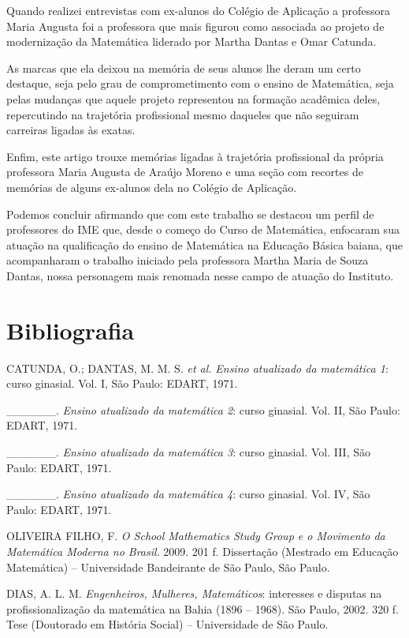 \documentclass{hipatia}
\begin{document}
\upshape

\sepdecorada

Quando realizei entrevistas com ex-alunos do Colégio de Aplicação a
professora Maria Augusta foi a professora que mais figurou como
associada ao projeto de modernização da Matemática liderado por Martha
Dantas e Omar Catunda.

As marcas que ela deixou na memória de seus alunos lhe deram um certo
destaque, seja pelo grau de comprometimento com o ensino de Matemática,
seja pelas mudanças que aquele projeto representou na formação acadêmica
deles, repercutindo na trajetória profissional mesmo daqueles que não
seguiram carreiras ligadas às exatas.

Enfim, este artigo trouxe memórias ligadas à trajetória profissional da
própria professora Maria Augusta de Araújo Moreno e uma seção com
recortes de memórias de alguns ex-alunos dela no Colégio de Aplicação.

Podemos concluir afirmando que com este trabalho se destacou um perfil
de professores do IME que, desde o começo do Curso de Matemática,
enfocaram sua atuação na qualificação do ensino de Matemática na Educação
Básica baiana, que acompanharam o trabalho iniciado pela professora
Martha Maria de Souza Dantas, nossa personagem mais renomada nesse campo
de atuação do Instituto.

\section{Bibliografia}

CATUNDA, O.; DANTAS, M. M. S. \emph{et al.} \emph{Ensino atualizado da
matemática 1}: curso ginasial. Vol. I, São Paulo: EDART, 1971.

\_\_\_\_\_\_. \emph{Ensino atualizado da matemática 2}: curso
ginasial. Vol. II, São Paulo: EDART, 1971.

\_\_\_\_\_\_. \emph{Ensino atualizado da matemática 3}: curso
ginasial. Vol. III, São Paulo: EDART, 1971.

\_\_\_\_\_\_. \emph{Ensino atualizado da matemática 4}: curso
ginasial. Vol. IV, São Paulo: EDART, 1971.

OLIVEIRA FILHO, F. \emph{O School Mathematics Study Group e o
Movimento da Matemática Moderna no Brasil}. 2009. 201 f. Dissertação
(Mestrado em Educação Matemática) -- Universidade Bandeirante de São
Paulo, São Paulo.

DIAS, A. L. M. \emph{Engenheiros, Mulheres, Matemáticos}: interesses e
disputas na profissionalização da matemática na Bahia (1896 -- 1968).
São Paulo, 2002. 320 f. Tese (Doutorado em História Social) --
Universidade de São Paulo.
\end{document}
